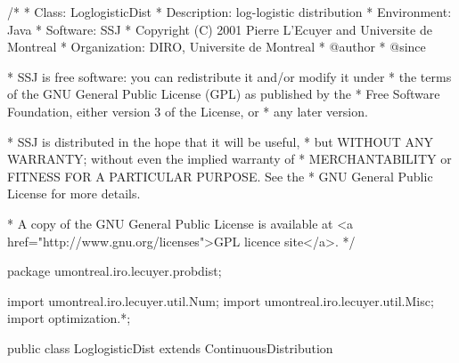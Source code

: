 \begin{code}
\begin{hide}
/*
 * Class:        LoglogisticDist
 * Description:  log-logistic distribution
 * Environment:  Java
 * Software:     SSJ
 * Copyright (C) 2001  Pierre L'Ecuyer and Universite de Montreal
 * Organization: DIRO, Universite de Montreal
 * @author
 * @since

 * SSJ is free software: you can redistribute it and/or modify it under
 * the terms of the GNU General Public License (GPL) as published by the
 * Free Software Foundation, either version 3 of the License, or
 * any later version.

 * SSJ is distributed in the hope that it will be useful,
 * but WITHOUT ANY WARRANTY; without even the implied warranty of
 * MERCHANTABILITY or FITNESS FOR A PARTICULAR PURPOSE.  See the
 * GNU General Public License for more details.

 * A copy of the GNU General Public License is available at
   <a href="http://www.gnu.org/licenses">GPL licence site</a>.
 */
\end{hide}
package umontreal.iro.lecuyer.probdist;
\begin{hide}
import umontreal.iro.lecuyer.util.Num;
import umontreal.iro.lecuyer.util.Misc;
import optimization.*;
\end{hide}

public class LoglogisticDist extends ContinuousDistribution\begin{hide} {
   private double alpha;
   private double beta;

   private static class Optim implements Uncmin_methods
   {
      private int n;
      private double[] xi;

      public Optim (double[] x, int n)
      {
         this.n = n;
         this.xi = new double[n];
         System.arraycopy (x, 0, this.xi, 0, n);
      }

      public double f_to_minimize (double[] p)
      {
         if ((p[1] <= 0.0) || (p[2] <= 0.0))
            return 1e200;

         double sum = 0.0;
         for (int i = 0; i < n; i++) {
	    double tmp = density (p[1], p[2], xi[i]);
            if (tmp > 0.0)
	        sum -= Math.log (tmp);
            else
	        sum += 709.0;    // log (Double.MIN_VALUE)
	 }
         return sum;
      }

      public void gradient (double[] x, double[] g)
      {
      }

      public void hessian (double[] x, double[][] h)
      {
      }
   }
\end{hide}
\end{code}
